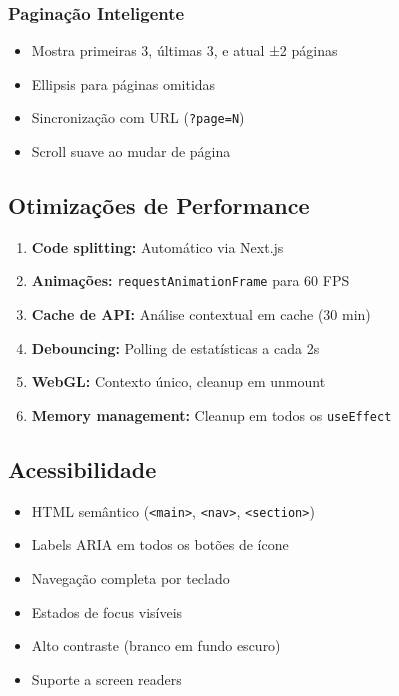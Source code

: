 \documentclass[12pt,a4paper]{article}
\begin{document}
\subsubsection{Paginação Inteligente}
\begin{itemize}
    \item Mostra primeiras 3, últimas 3, e atual ±2 páginas
    \item Ellipsis para páginas omitidas
    \item Sincronização com URL (\texttt{?page=N})
    \item Scroll suave ao mudar de página
\end{itemize}

\subsection{Otimizações de Performance}

\begin{enumerate}
    \item \textbf{Code splitting:} Automático via Next.js
    \item \textbf{Animações:} \texttt{requestAnimationFrame} para 60 FPS
    \item \textbf{Cache de API:} Análise contextual em cache (30 min)
    \item \textbf{Debouncing:} Polling de estatísticas a cada 2s
    \item \textbf{WebGL:} Contexto único, cleanup em unmount
    \item \textbf{Memory management:} Cleanup em todos os \texttt{useEffect}
\end{enumerate}

\subsection{Acessibilidade}

\begin{itemize}
    \item HTML semântico (\texttt{<main>}, \texttt{<nav>}, \texttt{<section>})
    \item Labels ARIA em todos os botões de ícone
    \item Navegação completa por teclado
    \item Estados de focus visíveis
    \item Alto contraste (branco em fundo escuro)
    \item Suporte a screen readers
\end{itemize}
\end{document}
